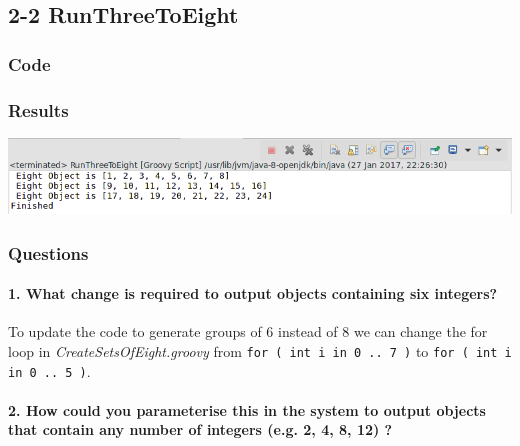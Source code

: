 \subsection{2-2 RunThreeToEight}

\subsubsection*{Code}


\subsubsection*{Results}

\includegraphics[width=\textwidth]{img/screenshots/2-2.png}


\subsubsection*{Questions}

\paragraph{1. What change is required to output objects containing six integers?}

To update the code to generate groups of 6 instead of 8 we can change the for loop in {\em CreateSetsOfEight.groovy} from \texttt{for ( int i in 0 .. 7 )} to \texttt{for ( int i in 0 .. 5 )}.

\paragraph{2. How could you parameterise this in the system to output objects that contain any number of integers (e.g. 2, 4, 8, 12) ?}

